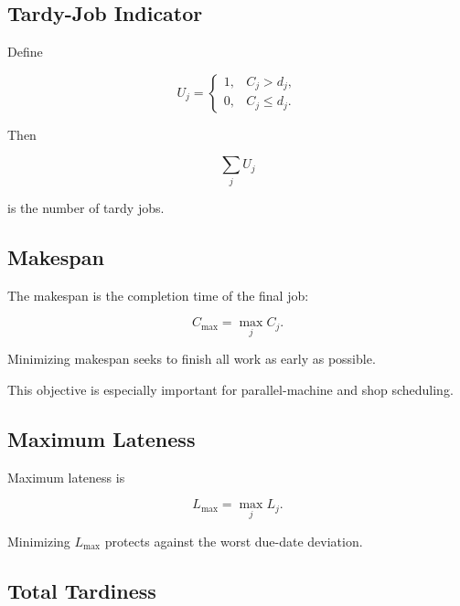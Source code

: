 \subsection{Tardy-Job Indicator}
\label{subsec:tardy-job-indicator}

Define

\[
\boxed{
U_j
=
\begin{cases}
1,
&
C_j>d_j,
\\
0,
&
C_j\leq d_j.
\end{cases}
}
\]

Then

\[
\boxed{
\sum_jU_j
}
\]

is the number of tardy jobs.

\subsection{Makespan}
\label{subsec:scheduling-makespan}

The makespan is the completion time of the final job:

\[
\boxed{
C_{\max}
=
\max_j
C_j.
}
\]

Minimizing makespan seeks to finish all work as early as possible.

This objective is especially important for parallel-machine and shop
scheduling.

\subsection{Maximum Lateness}
\label{subsec:maximum-lateness}

Maximum lateness is

\[
\boxed{
L_{\max}
=
\max_j
L_j.
}
\]

Minimizing \(L_{\max}\) protects against the worst due-date deviation.

\subsection{Total Tardiness}
\label{subsec:total-tardiness}

